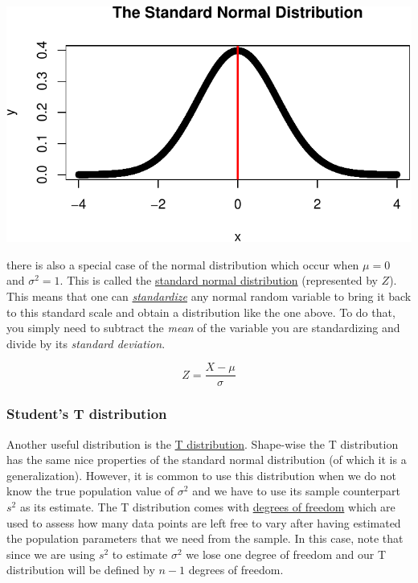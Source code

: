 \documentclass[
  letterpaper,
  DIV=11,
  numbers=noendperiod]{scrartcl}
\begin{document}
\begin{center}
\includegraphics{stats_review_files/figure-pdf/unnamed-chunk-18-1.pdf}
\end{center}

there is also a special case of the normal distribution which occur when
\(\mu=0\) and \(\sigma^2=1\). This is called the
\href{https://www.scribbr.com/statistics/standard-normal-distribution/}{standard
normal distribution} (represented by \(Z\)). This means that one can
\href{https://www.listendata.com/2017/04/how-to-standardize-variable-in-regression.html}{\emph{standardize}}
any normal random variable to bring it back to this standard scale and
obtain a distribution like the one above. To do that, you simply need to
subtract the \emph{mean} of the variable you are standardizing and
divide by its \emph{standard deviation}.

\[
Z = \frac{X - \mu}{\sigma}
\]

\subsubsection{Student's T distribution}\label{students-t-distribution}

Another useful distribution is the
\href{https://en.wikipedia.org/wiki/Student\%27s_t-distribution}{T
distribution}. Shape-wise the T distribution has the same nice
properties of the standard normal distribution (of which it is a
generalization). However, it is common to use this distribution when we
do not know the true population value of \(\sigma^2\) and we have to use
its sample counterpart \(s^{2}\) as its estimate. The T distribution
comes with
\href{https://www.scribbr.com/statistics/degrees-of-freedom/\#:~:text=Degrees\%20of\%20freedom\%2C\%20often\%20represented,minus\%20the\%20number\%20of\%20restrictions.}{degrees
of freedom} which are used to assess how many data points are left free
to vary after having estimated the population parameters that we need
from the sample. In this case, note that since we are using \(s^{2}\) to
estimate \(\sigma^{2}\) we lose one degree of freedom and our T
distribution will be defined by \(n-1\) degrees of freedom.
\end{document}
